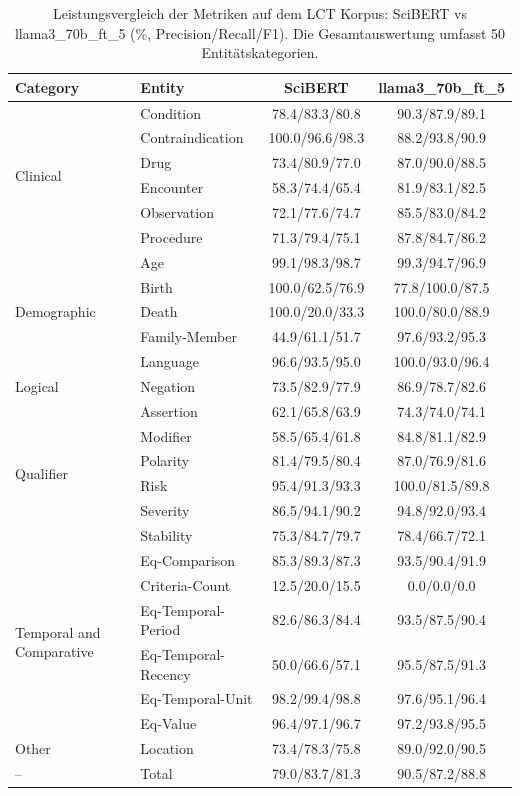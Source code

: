 
\begin{table}[htbp]
\centering
\begin{tabular}{llcc}
\toprule
\textbf{Category} & \textbf{Entity} & \textbf{SciBERT} & \textbf{llama3_70b_ft_5} \\
\midrule
\multirow{6}{*}{Clinical} & Condition & 78.4/83.3/80.8 & 90.3/87.9/89.1 \\
 & Contraindication & 100.0/96.6/98.3 & 88.2/93.8/90.9 \\
 & Drug & 73.4/80.9/77.0 & 87.0/90.0/88.5 \\
 & Encounter & 58.3/74.4/65.4 & 81.9/83.1/82.5 \\
 & Observation & 72.1/77.6/74.7 & 85.5/83.0/84.2 \\
 & Procedure & 71.3/79.4/75.1 & 87.8/84.7/86.2 \\
\midrule
\multirow{5}{*}{Demographic} & Age & 99.1/98.3/98.7 & 99.3/94.7/96.9 \\
 & Birth & 100.0/62.5/76.9 & 77.8/100.0/87.5 \\
 & Death & 100.0/20.0/33.3 & 100.0/80.0/88.9 \\
 & Family-Member & 44.9/61.1/51.7 & 97.6/93.2/95.3 \\
 & Language & 96.6/93.5/95.0 & 100.0/93.0/96.4 \\
\midrule
Logical & Negation & 73.5/82.9/77.9 & 86.9/78.7/82.6 \\
\midrule
\multirow{6}{*}{Qualifier} & Assertion & 62.1/65.8/63.9 & 74.3/74.0/74.1 \\
 & Modifier & 58.5/65.4/61.8 & 84.8/81.1/82.9 \\
 & Polarity & 81.4/79.5/80.4 & 87.0/76.9/81.6 \\
 & Risk & 95.4/91.3/93.3 & 100.0/81.5/89.8 \\
 & Severity & 86.5/94.1/90.2 & 94.8/92.0/93.4 \\
 & Stability & 75.3/84.7/79.7 & 78.4/66.7/72.1 \\
\midrule
\multirow{6}{*}{Temporal and Comparative} & Eq-Comparison & 85.3/89.3/87.3 & 93.5/90.4/91.9 \\
 & Criteria-Count & 12.5/20.0/15.5 & 0.0/0.0/0.0 \\
 & Eq-Temporal-Period & 82.6/86.3/84.4 & 93.5/87.5/90.4 \\
 & Eq-Temporal-Recency & 50.0/66.6/57.1 & 95.5/87.5/91.3 \\
 & Eq-Temporal-Unit & 98.2/99.4/98.8 & 97.6/95.1/96.4 \\
 & Eq-Value & 96.4/97.1/96.7 & 97.2/93.8/95.5 \\
\midrule
Other & Location & 73.4/78.3/75.8 & 89.0/92.0/90.5 \\
\midrule
-- & Total & 79.0/83.7/81.3 & 90.5/87.2/88.8 \\
\bottomrule
\end{tabular}
\caption{Leistungsvergleich der Metriken auf dem LCT Korpus: SciBERT vs llama3_70b_ft_5 (\%, Precision/Recall/F1). Die Gesamtauswertung umfasst 50 Entitätskategorien.}
\label{tab:metrics_comparison}
\end{table}
    